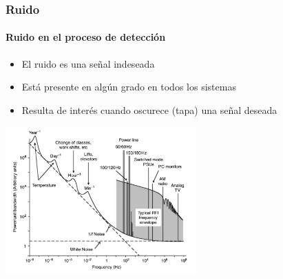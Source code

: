 \documentclass{beamer}
\begin{document}
\begin{frame}
\frametitle{Ruido}
\framesubtitle{Ruido en el proceso de detección}
\begin{itemize}
\item El ruido es una señal indeseada
\item Está presente en algún grado en todos los sistemas
\item Resulta de interés cuando oscurece (tapa) una señal deseada
\end{itemize}
\begin{center}
\includegraphics[width=0.55\textwidth]{d1/environmental_noise_spectrum}
\end{center}
\end{frame} 
\end{document}
